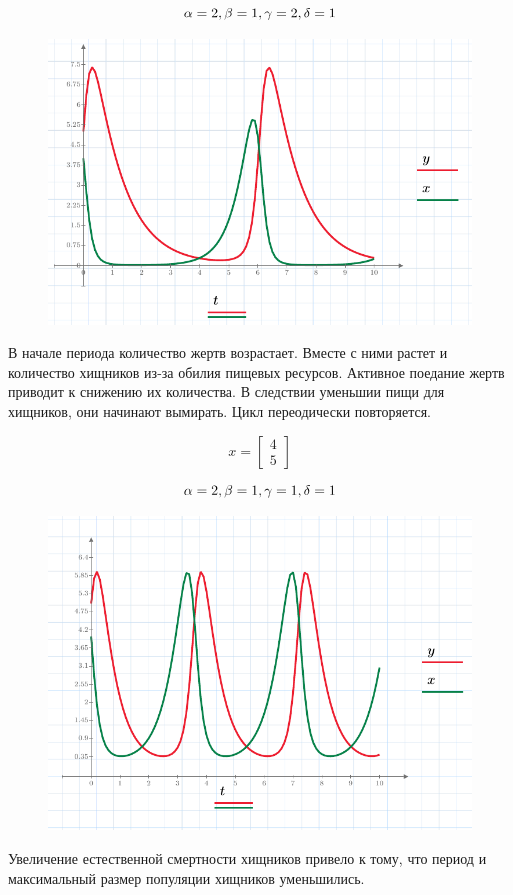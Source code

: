 \documentclass[a4paper, 14pt]{extarticle}
\begin{document}
		\noindent\[
			\alpha = 2,\\
			\beta = 1,\\
			\gamma = 2,\\
			\delta = 1
		\]
		\begin{figure}[H]
			\centering
			\includegraphics[width = \linewidth]{3.pdf}
			\caption[.] {}
		\end{figure}
		В начале периода количество жертв возрастает. Вместе с ними растет и количество хищников из-за обилия
		пищевых ресурсов. Активное поедание жертв приводит к снижению их количества. В следствии уменьшии пищи для хищников, они начинают вымирать. Цикл переодически повторяется.
		\pagebreak
		
		\noindent \[ x = \begin{bmatrix}
			4 \\ 5
		\end{bmatrix} \]
		
		\noindent\[
		\alpha = 2,\\
		\beta = 1,\\
		\gamma = 1,\\
		\delta = 1
		\]
		\begin{figure}[H]
			\centering
			\includegraphics[width = \linewidth]{4.pdf}
			\caption[.] {}
		\end{figure}
		Увеличение естественной смертности хищников привело к тому, что период и максимальный размер популяции
		хищников уменьшились.
		\pagebreak
		
\end{document}
